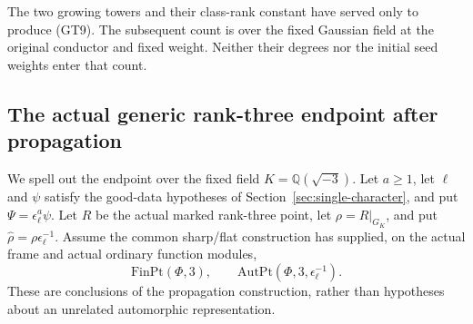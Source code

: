 The two growing towers and their class-rank constant
have served only to produce (GT9).
The subsequent count is over the fixed Gaussian
field at the original conductor and fixed weight.
Neither their degrees nor the initial seed weights
enter that count.

\subsection{The actual generic rank-three endpoint after propagation}
\label{subsec:sr-generic-three-endpoint}
We spell out the endpoint over the fixed field
\(K=\mathbb Q(\sqrt{-3})\).
Let \(a\ge1\), let \(\ell\) and \(\psi\) satisfy the
good-data hypotheses of Section~\ref{sec:single-character},
and put \(\Psi=\epsilon_\ell^a\psi\).
Let \(R\) be the actual marked rank-three point, let
\(\rho=R|_{G_K}\), and put
\(\widehat\rho=\rho\epsilon_\ell^{-1}\).
Assume the common sharp/flat construction has supplied,
on the actual frame and actual ordinary function modules,
\[
 \mathrm{FinPt}(\Phi,3),\qquad
 \mathrm{AutPt}(\Phi,3,\epsilon_\ell^{-1}).
 \tag{GE1}
\]
These are conclusions of the propagation construction,
rather than hypotheses about an unrelated automorphic
representation.

